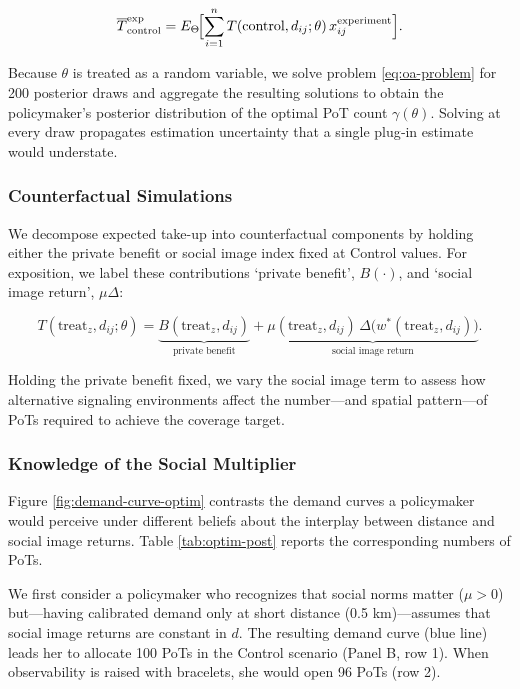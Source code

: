 \documentclass[12pt,a4paper]{article}
\begin{document}
\[
\overline T^{\text{exp}}_{\text{control}}
   = E_{\Theta}\!\Bigl[\sum_{i=1}^{n}
      T(\text{control},d_{ij};\theta)\,
      x_{ij}^{\text{experiment}}\Bigr].
\]

Because \(\theta\) is treated as a random variable, we solve problem \eqref{eq:oa-problem} for 200 posterior draws and aggregate the resulting solutions to obtain the policymaker’s posterior distribution of the optimal PoT count \(\gamma(\theta)\). Solving at every draw propagates estimation uncertainty that a single plug‑in estimate would understate.


\hypertarget{counterfactual-simulations}{%
\subsubsection{Counterfactual
Simulations}\label{counterfactual-simulations}}
We decompose expected take-up into counterfactual components by holding either 
the private benefit or social image index fixed at Control values. For exposition, 
we label these contributions `private benefit', $B(\cdot)$, and 
`social image return', $\mu\Delta$:

\[
T(\text{treat}_z,d_{ij};\theta)
=
\underbrace{B(\text{treat}_z,d_{ij})}_{\text{private benefit}}
+
\underbrace{\mu(\text{treat}_z,d_{ij})\,
            \Delta\bigl(w^{\ast}(\text{treat}_z,d_{ij})\bigr)}
            _{\text{social image return}}.
\]

Holding the private benefit fixed, we vary the social image term to assess how alternative signaling environments affect the number—and spatial pattern—of PoTs required to achieve the coverage target. 

\subsubsection*{Knowledge of the Social Multiplier}

Figure \ref{fig:demand-curve-optim} contrasts the demand curves a policymaker would perceive under different beliefs about the interplay between distance and social image returns. Table \ref{tab:optim-post} reports the corresponding numbers of PoTs. 

We first consider a policymaker who recognizes that social norms matter (\(\mu>0\)) but—having calibrated demand only at short distance (0.5 km)—assumes that social image returns are constant in \(d\). The resulting demand curve (blue line) leads her to allocate 100 PoTs in the Control scenario (Panel B, row 1). When observability is raised with bracelets, she would open 96 PoTs (row 2).
\end{document}
